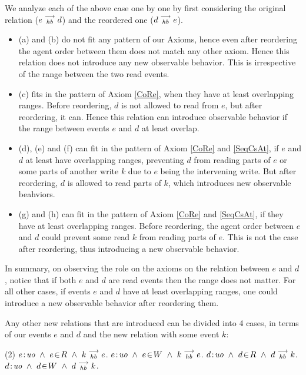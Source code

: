     We analyze each of the above case one by one by first considering the original relation ($e\stackrel{\longrightarrow}{_{hb}}d$) and the reordered one ($d\stackrel{\longrightarrow}{_{hb}}e$). 
    \begin{itemize}
        \item (a) and (b) do not fit any pattern of our Axioms, hence even after reordering the agent order between them does not match any other axiom. Hence this relation does not introduce any new observable behavior. This is irrespective of the range between the two read events.
        \item (c) fits in the pattern of Axiom \ref{CoRe}, when they have at least overlapping ranges. Before reordering, $d$ is not allowed to read from $e$, but after reordering, it can. Hence this relation can introduce observable behavior if the range between events $e$ and $d$ at least overlap. 
        \item (d), (e) and (f) can fit in the pattern of Axiom \ref{CoRe} and \ref{SeqCsAt}, if $e$ and $d$ at least have overlapping ranges, preventing $d$ from reading parts of $e$ or some parts of another write $k$ due to $e$ being the intervening write. But after reordering, $d$ is allowed to read parts of $k$, which introduces new observable beahviors.
        \item (g) and (h) can fit in the pattern of Axiom \ref{CoRe} and \ref{SeqCsAt}, if they have at least overlapping ranges. Before reordering, the agent order between $e$ and $d$ could prevent some read $k$ from reading parts of $e$. This is not the case after reordering, thus introducing a new observable behavior. 
    \end{itemize}

    In summary, on observing the role on the axioms on the relation between $e$ and $d$, notice that if both $e$ and $d$ are read events then the range does not matter. For all other cases, if events $e$ and $d$ have at least overlapping ranges, one could introduce a new observable behavior after reordering them.
    
    
    Any other new relations that are introduced can be divided into 4 cases, in terms of our events $e$ and $d$ and the new relation with some event $k$:
    \begin{tasks}(2)
        \task  $\et{e}{uo} \ \wedge \ \event{e}{R} \ \wedge \ \reln{k}{hb}{e}$.
        \task  $e\!:\!\textit{uo} \ \wedge \ e\!\in\!W \ \wedge \ k\stackrel{\longrightarrow}{_{hb}}e$.
        \task  $\et{d}{uo} \ \wedge \ \event{d}{R} \ \wedge \ \reln{d}{hb}{k}$.
        \task  $d\!:\!\textit{uo} \ \wedge \ d\!\in\!W \ \wedge \ d\stackrel{\longrightarrow}{_{hb}}k$.
    \end{tasks}
    
